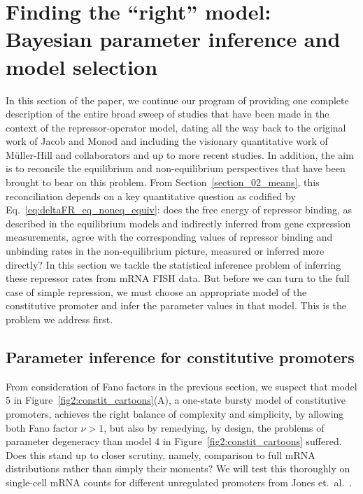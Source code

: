 \section{Finding the ``right'' model: Bayesian parameter inference and model 
selection}
\label{section_04_bayesian_inference}

In this section of the paper, we continue our program of providing
one complete description of the entire broad sweep of studies
that have been made in the context of the repressor-operator model,
dating all the way back to the original work of Jacob and Monod
and including the visionary quantitative work of M\"{u}ller-Hill and collaborators
and up to more recent studies.   In addition, the aim is to reconcile the 
equilibrium and non-equilibrium perspectives that have been brought
to bear on this problem. From Section~\ref{section_02_means}, this reconciliation
depends on a key quantitative question as codified by Eq.~\ref{eq:deltaFR_eq_noneq_equiv}: does the free energy of repressor binding, as described in the equilibrium models and indirectly inferred from gene expression measurements, agree with the corresponding values of repressor binding and unbinding rates in the non-equilibrium picture, measured or inferred more directly? In this section we tackle the statistical inference problem of inferring these repressor rates from mRNA FISH data. But before we can turn to the full case of simple repression, we must choose an appropriate model of the constitutive promoter and infer the parameter values in that model. This is the problem we address first.


\subsection{Parameter inference for constitutive promoters}

From consideration of Fano factors in the previous section, we suspect that
model 5 in Figure~\ref{fig2:constit_cartoons}(A), a one-state bursty model of
constitutive promoters, achieves the right balance of complexity
and simplicity, by allowing both Fano factor $\nu>1$, but also by
remedying, by design, the problems of parameter degeneracy than
model 4 in Figure~\ref{fig2:constit_cartoons} suffered. Does this
stand up to closer scrutiny, namely, comparison to full mRNA distributions
rather than simply their moments? We will test this thoroughly on
single-cell mRNA counts for different unregulated promoters from Jones et.\
al.~\cite{Jones2014}.

